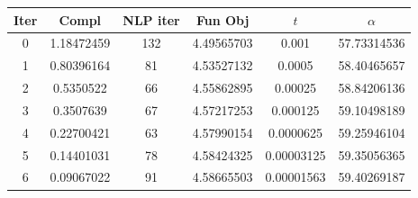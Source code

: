 \begin{tabular}{c c c c c c}
\toprule
Iter & Compl & NLP iter & Fun Obj & $t$ & $\alpha$ \\
\midrule
0 & 1.18472459 & 132 & 4.49565703 & 0.001 & 57.73314536 \\
1 & 0.80396164 & 81 & 4.53527132 & 0.0005 & 58.40465657 \\
2 & 0.5350522 & 66 & 4.55862895 & 0.00025 & 58.84206136 \\
3 & 0.3507639 & 67 & 4.57217253 & 0.000125 & 59.10498189 \\
4 & 0.22700421 & 63 & 4.57990154 & 0.0000625 & 59.25946104 \\
5 & 0.14401031 & 78 & 4.58424325 & 0.00003125 & 59.35056365 \\
6 & 0.09067022 & 91 & 4.58665503 & 0.00001563 & 59.40269187 \\
\bottomrule
\end{tabular}